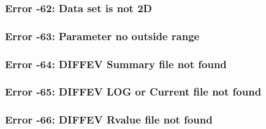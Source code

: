 \subsubsection{Error -62: Data set is not 2D}
\subsubsection{Error -63: Parameter no outside range}
\subsubsection{Error -64: DIFFEV Summary file not found}
\subsubsection{Error -65: DIFFEV LOG  or Current file not found}
\subsubsection{Error -66: DIFFEV Rvalue file not found}
